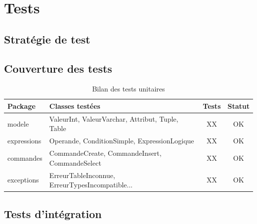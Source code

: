 
\section{Tests}

\subsection{Stratégie de test}

\subsection{Couverture des tests}

\begin{table}[H]
\centering
\begin{tabularx}{\textwidth}{lXcc}
\toprule
\textbf{Package} & \textbf{Classes testées} & \textbf{Tests} & \textbf{Statut} \\
\midrule
modele      & ValeurInt, ValeurVarchar, Attribut, Tuple, Table & XX & \textcolor{codegreen}{OK} \\
expressions & Operande, ConditionSimple, ExpressionLogique     & XX & \textcolor{codegreen}{OK} \\
commandes   & CommandeCreate, CommandeInsert, CommandeSelect   & XX & \textcolor{codegreen}{OK} \\
exceptions  & ErreurTableInconnue, ErreurTypesIncompatible...  & XX & \textcolor{codegreen}{OK} \\
\bottomrule
\end{tabularx}
\caption{Bilan des tests unitaires}
\end{table}

\subsection{Tests d'intégration}

